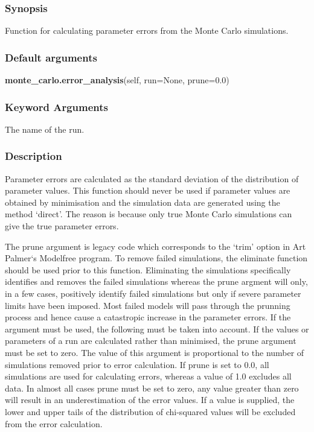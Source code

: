 \subsubsection{Synopsis}

Function for calculating parameter errors from the Monte Carlo simulations.

\subsubsection{Default arguments}

\textsf{\textbf{monte\_carlo.error\_analysis}(self, run=None, prune=0.0)}


\subsubsection{Keyword Arguments}

  The name of the run.


\subsubsection{Description}

Parameter errors are calculated as the standard deviation of the distribution of parameter
values.  This function should never be used if parameter values are obtained by minimisation
and the simulation data are generated using the method `direct'.  The reason is because only
true Monte Carlo simulations can give the true parameter errors.

The prune argument is legacy code which corresponds to the `trim' option in Art Palmer`s
Modelfree program.  To remove failed simulations, the eliminate function should be used
prior to this function.  Eliminating the simulations specifically identifies and removes the
failed simulations whereas the prune argment will only, in a few cases, positively identify
failed simulations but only if severe parameter limits have been imposed.  Most failed
models will pass through the prunning process and hence cause a catastropic increase in the
parameter errors.  If the argument must be used, the following must be taken into account.
If the values or parameters of a run are calculated rather than minimised, the prune
argument must be set to zero.  The value of this argument is proportional to the number of
simulations removed prior to error calculation.  If prune is set to 0.0, all simulations are
used for calculating errors, whereas a value of 1.0 excludes all data.  In almost all cases
prune must be set to zero, any value greater than zero will result in an underestimation of
the error values.  If a value is supplied, the lower and upper tails of the distribution of
chi-squared values will be excluded from the error calculation.



